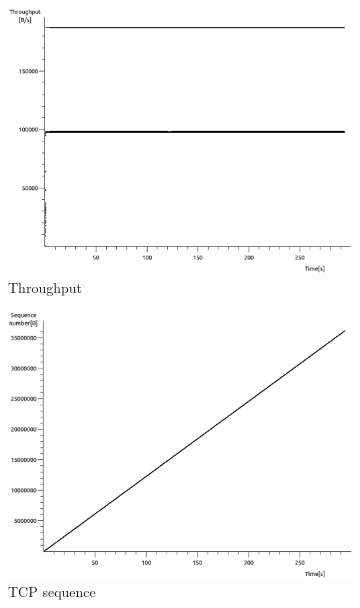 \documentclass[conference,a4paper]{IEEEtran}
\begin{document}
\begin{figure}
 \centering
 \begin{subfigure}[b]{0.2\textwidth}
  \includegraphics[width=\textwidth]{s1-0_thru}
  \caption{Throughput}
 \end{subfigure}
 \begin{subfigure}[b]{0.2\textwidth}
  \includegraphics[width=\textwidth]{s1-0_seq}
  \caption{TCP sequence}
 \end{subfigure}
 \begin{subfigure}[b]{0.2\textwidth}

\end{subfigure}
\end{figure}
\end{document}
